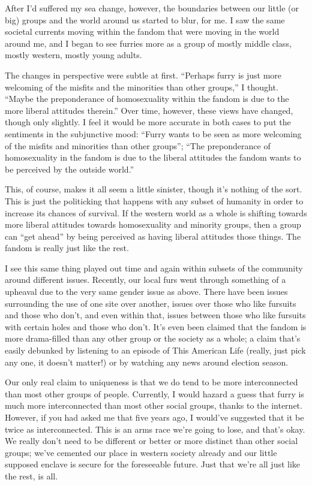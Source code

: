 After I'd suffered my sea change, however, the boundaries between our little (or big) groups and the world around us started to blur, for me.  I saw the same societal currents moving within the fandom that were moving in the world around me, and I began to see furries more as a group of mostly middle class, mostly western, mostly young adults.

The changes in perspective were subtle at first.  ``Perhaps furry is just more welcoming of the misfits and the minorities than other groups,'' I thought.  ``Maybe the preponderance of homosexuality within the fandom is due to the more liberal attitudes therein.''  Over time, however, these views have changed, though only slightly.  I feel it would be more accurate in both cases to put the sentiments in the subjunctive mood: ``Furry wants to be seen as more welcoming of the misfits and minorities than other groups''; ``The preponderance of homosexuality in the fandom is due to the liberal attitudes the fandom wants to be perceived by the outside world.''

This, of course, makes it all seem a little sinister, though it's nothing of the sort.  This is just the politicking that happens with any subset of humanity in order to increase its chances of survival.  If the western world as a whole is shifting towards more liberal attitudes towards homosexuality and minority groups, then a group can ``get ahead'' by being perceived as having liberal attitudes those things.  The fandom is really just like the rest.

I see this same thing played out time and again within subsets of the community around different issues.  Recently, our local furs went through something of a upheaval due to the very same gender issue as above.  There have been  issues surrounding the use of one site over another, issues over those who like fursuits and those who don't, and even within that, issues between those who like fursuits with certain holes and those who don't.  It's even been claimed that the fandom is more drama-filled than any other group or the society as a whole; a claim that's easily debunked by listening to an episode of This American Life (really, just pick any one, it doesn't matter!) or by watching any news around election season.

Our only real claim to uniqueness is that we do tend to be more interconnected than most other groups of people.  Currently, I would hazard a guess that furry is much more interconnected than most other social groups, thanks to the internet.  However, if you had asked me that five years ago, I would've suggested that it be twice as interconnected.  This is an arms race we're going to lose, and that's okay.  We really don't need to be different or better or more distinct than other social groups; we've cemented our place in western society already and our little supposed enclave is secure for the foreseeable future.  Just that we're all just like the rest, is all.
